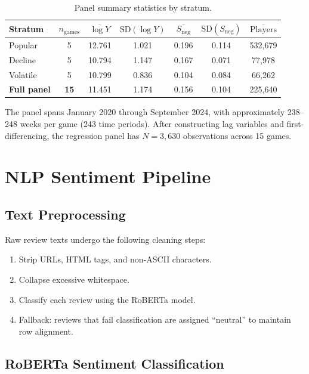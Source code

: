 \documentclass[11pt, letterpaper]{article}
\begin{document}
\begin{table}[H]
\centering
\small
\caption{Panel summary statistics by stratum.}
\label{tab:summary}
\begin{tabular}{lcccccc}
\toprule
\textbf{Stratum} & $n_{\text{games}}$ & $\overline{\log Y}$ & $\text{SD}(\log Y)$ & $\overline{S_{\text{neg}}}$ & $\text{SD}(S_{\text{neg}})$ & $\overline{\text{Players}}$ \\
\midrule
Popular  & 5 & 12.761 & 1.021 & 0.196 & 0.114 & 532{,}679 \\
Decline  & 5 & 10.794 & 1.147 & 0.167 & 0.071 & 77{,}978 \\
Volatile & 5 & 10.799 & 0.836 & 0.104 & 0.084 & 66{,}262 \\
\midrule
\textbf{Full panel} & \textbf{15} & 11.451 & 1.174 & 0.156 & 0.104 & 225{,}640 \\
\bottomrule
\end{tabular}
\end{table}

The panel spans January 2020 through September 2024, with approximately 238--248 weeks per game (243 time periods).
After constructing lag variables and first-differencing, the regression panel has $N = 3{,}630$ observations across 15 games.

\section{NLP Sentiment Pipeline}\label{sec:nlp}

\subsection{Text Preprocessing}

Raw review texts undergo the following cleaning steps:
\begin{enumerate}[nosep]
    \item Strip URLs, HTML tags, and non-ASCII characters.
    \item Collapse excessive whitespace.
    \item Classify each review using the RoBERTa model.
    \item Fallback: reviews that fail classification are assigned ``neutral'' to maintain row alignment.
\end{enumerate}

\subsection{RoBERTa Sentiment Classification}
\end{document}
